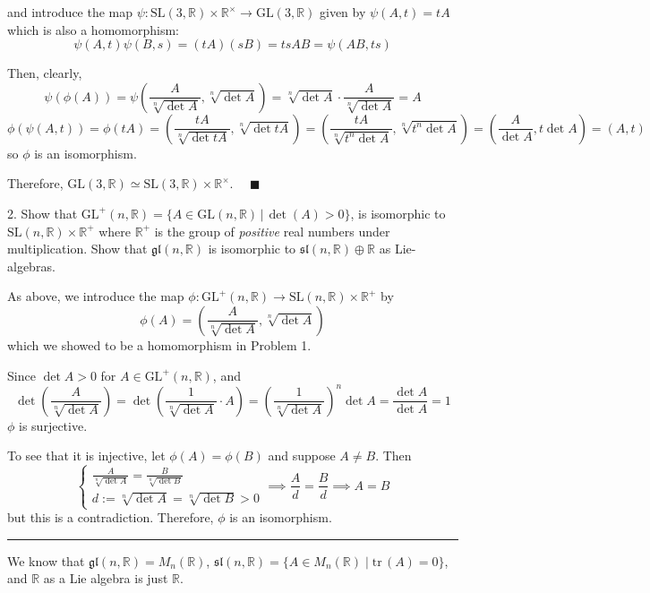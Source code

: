 \documentclass[12pt]{article}
\newcommand{\R}{\mathbb{R}}
\newcommand{\GL}{\text{GL}}
\newcommand{\SL}{\text{SL}}
\newcommand{\gl}{\mathfrak{gl}}
\newcommand{\sll}{\mathfrak{sl}}
\newcommand{\qed}{\quad \blacksquare}
\newcommand{\tr}{\text{tr}\,}
\begin{document}
        and introduce the map $\psi: \SL(3, \R) \times \R^{\times} \to \GL(3, \R)$ given by $\psi(A, t)= tA$ which is also a homomorphism:
        \[\psi(A, t)\psi(B, s) = (tA)(sB) = tsAB= \psi(AB, ts)\]
        
        Then, clearly, 
        \[\psi(\phi(A)) = \psi(\frac{A}{\sqrt[n]{\det A}}, \sqrt[n]{\det A}) = \sqrt[n]{\det A} \cdot \frac{A}{\sqrt[n]{\det A}} = A\]
        \[\phi(\psi(A, t)) = \phi(tA) = (\frac{tA}{\sqrt[n]{\det tA}}, \sqrt[n]{\det tA}) = (\frac{tA}{\sqrt[n]{t^n \det A}}, \sqrt[n]{t^n \det A}) = (\frac{A}{\det A}, t \det A) = (A, t)\]
        so $\phi$ is an isomorphism. 

        Therefore, $\GL(3, \R) \simeq \SL(3, \R) \times \R^{\times}$. $\qed$
    \color{black}

\pagebreak

2.  Show that $\GL^{+}(n,\R) = \{A \in \GL(n,\R) \, | \, \det(A) > 0\}$, is isomorphic to $\SL(n,\R)\times \R^{+}$ where $\R^{+}$ is the group of \emph{positive} real numbers under multiplication.  Show that $\gl(n,\R)$ is isomorphic to $\sll(n,\R)\oplus \R$ as Lie-algebras. 

    \color{blue}

        As above, we introduce the map $\phi: \GL^+(n, \R) \to \SL(n, \R) \times \R^+ $ by 
        \[\phi(A) = (\frac{A}{\sqrt[n]{\det A}}, \sqrt[n]{\det A})\] 
        which we showed to be a homomorphism in Problem 1. 

        Since $\det A > 0$ for $A \in \GL^+(n, \R)$, and 
        \[\det(\frac{A}{\sqrt[n]{\det A}}) = \det\left(\frac{1}{\sqrt[n]{\det A}} \cdot A\right) = \left(\frac{1}{\sqrt[n]{\det A}}\right)^n \det A = \frac{\det A}{\det A} = 1\]
        $\phi$ is surjective. 

        To see that it is injective, let $\phi(A) = \phi(B)$ and suppose $A \neq B$. Then 
        \[\begin{cases}
            \frac{A}{\sqrt[n]{\det A}} = \frac{B}{\sqrt[n]{\det B}}\\
            d := \sqrt[n]{\det A} = \sqrt[n]{\det B} > 0
        \end{cases} \implies \frac{A}{d} = \frac{B}{d} \implies A = B\]
        but this is a contradiction. Therefore, $\phi$ is an isomorphism.
        
        \vspace*{10pt}
        \hrule 
        \vspace*{10pt}

        We know that $\gl(n, \R) = M_n(\R)$, $\sll(n, \R) = \{A \in M_n(\R) \; | \; \tr(A) = 0\}$, and $\R$ as a Lie algebra is just $\R$.
\end{document}
